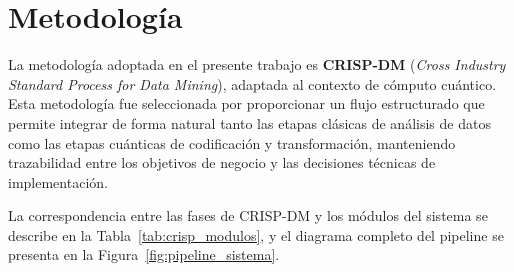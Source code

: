 
\newpage
\section{Metodología}

La metodología adoptada en el presente trabajo es
\textbf{CRISP-DM} (\textit{Cross Industry Standard Process
for Data Mining}), adaptada al contexto de cómputo cuántico.
Esta metodología fue seleccionada por proporcionar un flujo
estructurado que permite integrar de forma natural
tanto las etapas clásicas de análisis de datos como las
etapas cuánticas de codificación y transformación,
manteniendo trazabilidad entre los objetivos de negocio
y las decisiones técnicas de implementación.

La correspondencia entre las fases de CRISP-DM y los módulos
del sistema se describe en la
Tabla~\ref{tab:crisp_modulos}, y el diagrama completo del
pipeline se presenta en la
Figura~\ref{fig:pipeline_sistema}.

